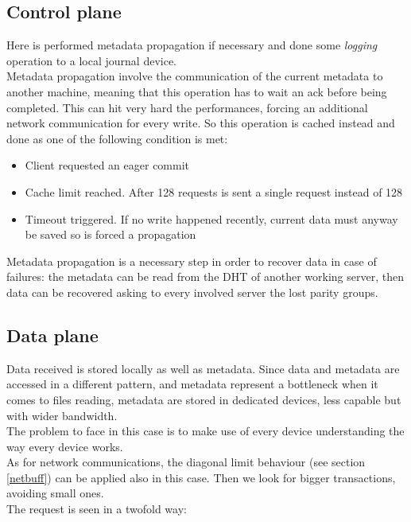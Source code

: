\subsection{Control plane}
Here is performed metadata propagation if necessary and done some
\textit{logging} operation to a local journal device. \\ Metadata propagation
involve the communication of the current metadata to another machine, meaning
that this operation has to wait an ack before being completed.  This can hit
very hard the performances, forcing an additional network communication for
every write. So this operation is cached instead and done as one of the
following condition is met:
\begin{itemize}
    \item Client requested an eager commit
    \item Cache limit reached. After 128 requests is sent a single request
        instead of 128
    \item Timeout triggered. If no write happened recently, current
        data must anyway be saved so is forced a propagation
\end{itemize}
Metadata propagation is a necessary step in order to recover data in case of
failures: the metadata can be read from the DHT of another working server, then
data can be recovered asking to every involved server the lost parity groups.

\subsection{Data plane}
Data received is stored locally as well as metadata. Since data and metadata
are accessed in a different pattern, and metadata represent a bottleneck when
it comes to files reading, metadata are stored in dedicated devices, less
capable but with wider bandwidth. \\
The problem to face in this case is to make use of every device understanding
the way every device works. \\
As for network communications, the diagonal limit behaviour (see section
\ref{netbuff}) can be applied also in this case. Then we look for bigger
transactions, avoiding small ones. \\
The request is seen in a twofold way: \\

